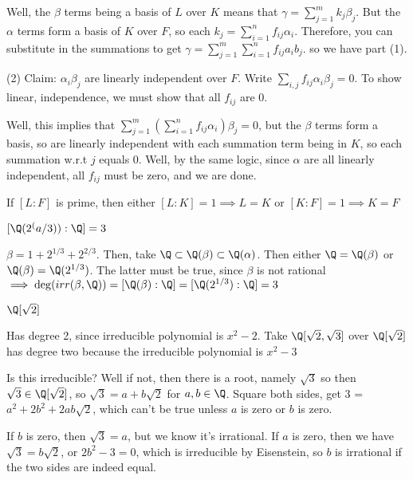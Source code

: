 \documentclass[twoside, 10pt]{article}
\begin{document}
Well, the $\beta$ terms being a basis of $L$ over $K$ means that $\gamma = \sum\limits_{j = 1}^m k_j \beta_j$. But the $\alpha$ terms form a basis of $K$ over $F$, so each $k_j = \sum\limits_{i = 1}^n f_{ij}\alpha_i$. Therefore, you can substitute in the summations to get $\gamma = \sum\limits_{j=1}^m \sum\limits_{i = 1}^n f_{ij}a_ib_j$. so we have part (1).

(2) Claim: $\alpha_i\beta_j$ are linearly independent over $F$.
Write $\sum_{i, j}f_{ij}\alpha_i\beta_{j} = 0$. To show linear, independence, we must show that all $f_{ij}$ are 0.

Well, this implies that $\sum\limits_{j = 1}^m (\sum\limits_{i = 1}^n f_{ij} \alpha _i)\beta_j = 0$, but the $\beta$ terms form a basis, so are linearly independent with each summation term being in $K$, so each summation w.r.t $j$ equals 0. Well, by the same logic, since $\alpha$ are all linearly independent, all $f_{ij}$ must be zero, and we are done.

\begin{cor}
    If $[L : F]$ is prime, then either $[L : K] = 1 \implies L = K$ or $[K : F] = 1 \implies K = F$
\end{cor}

\begin{exm*}
    $[\Q(2^(a/3)) : \Q] = 3$
\end{exm*}
$\beta = 1 + 2^{1/3} + 2^{2/3}$. Then, take $\Q \subset \Q(\beta) \subset \Q(\alpha)$. Then either $\Q = \Q(\beta)$ or $\Q(\beta) = \Q(2^{1/3})$. The latter must be true, since $\beta$ is not rational $\implies \deg(irr(\beta, \Q)) = [\Q(\beta): \Q] = [\Q(2^{1/3}): \Q] = 3$

\begin{exm*}
    $\Q[\sqrt{2}]$
\end{exm*}
Has degree 2, since irreducible polynomial is $x^2 - 2$. Take $\Q[\sqrt{2}, \sqrt{3}]$ over $\Q[\sqrt{2}]$ has degree two because the irreducible polynomial is $x^2 - 3$ 

Is this irreducible? Well if not, then there is a root, namely $\sqrt3$ so then $\sqrt{3} \in \Q[\sqrt{2}]$, so $\sqrt3 = a + b\sqrt2$ for $a, b \in \Q$. Square both sides, get 3 = $a^2 + 2b^2 + 2ab\sqrt{2}$, which can't be true unless $a$ is zero or $b$ is zero.

If $b$ is zero, then $\sqrt{3} = a$, but we know it's irrational. If $a$ is zero, then we have $\sqrt{3} = b\sqrt{2}$, or $2b^2 - 3 = 0$, which is irreducible by Eisenstein, so $b$ is irrational if the two sides are indeed equal. 
\end{document}
